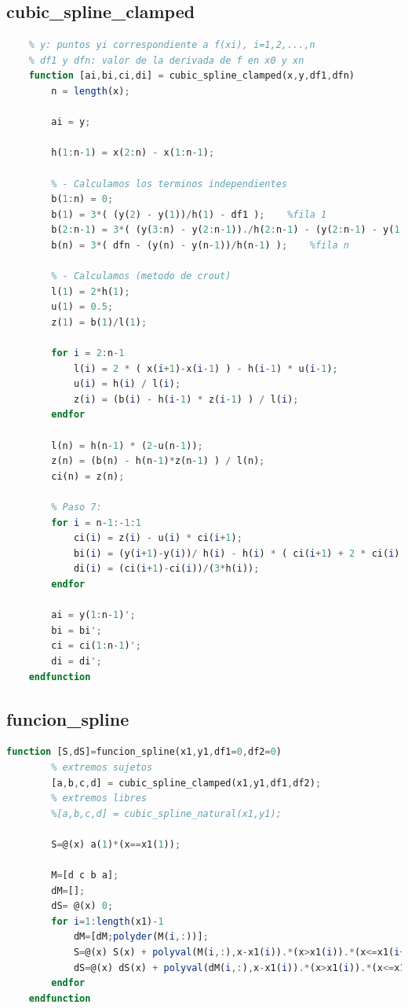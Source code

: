 \documentclass{article}
\begin{document}
    \subsection{cubic\_spline\_clamped}
    \begin{lstlisting}[language=Octave]
    % x: puntos xi, i=1,2,...,n
    % y: puntos yi correspondiente a f(xi), i=1,2,...,n
    % df1 y dfn: valor de la derivada de f en x0 y xn
    function [ai,bi,ci,di] = cubic_spline_clamped(x,y,df1,dfn)
        n = length(x);
    
        ai = y;
    
        h(1:n-1) = x(2:n) - x(1:n-1);
    
        % - Calculamos los terminos independientes
        b(1:n) = 0;
        b(1) = 3*( (y(2) - y(1))/h(1) - df1 );    %fila 1
        b(2:n-1) = 3*( (y(3:n) - y(2:n-1))./h(2:n-1) - (y(2:n-1) - y(1:n-2))./h(1:n-2) );   %filas 2...n-1
        b(n) = 3*( dfn - (y(n) - y(n-1))/h(n-1) );    %fila n
    
        % - Calculamos (metodo de crout)
        l(1) = 2*h(1); 
        u(1) = 0.5;
        z(1) = b(1)/l(1);
    
        for i = 2:n-1
            l(i) = 2 * ( x(i+1)-x(i-1) ) - h(i-1) * u(i-1);
            u(i) = h(i) / l(i);
            z(i) = (b(i) - h(i-1) * z(i-1) ) / l(i);
        endfor
    
        l(n) = h(n-1) * (2-u(n-1));
        z(n) = (b(n) - h(n-1)*z(n-1) ) / l(n);
        ci(n) = z(n);
    
        % Paso 7:
        for i = n-1:-1:1
            ci(i) = z(i) - u(i) * ci(i+1);
            bi(i) = (y(i+1)-y(i))/ h(i) - h(i) * ( ci(i+1) + 2 * ci(i) ) / 3;
            di(i) = (ci(i+1)-ci(i))/(3*h(i));
        endfor
    
        ai = y(1:n-1)';
        bi = bi';
        ci = ci(1:n-1)';
        di = di';
    endfunction
    \end{lstlisting}
    
    \subsection{funcion\_spline}
    \begin{lstlisting}[language=Octave]
    function [S,dS]=funcion_spline(x1,y1,df1=0,df2=0)
        % extremos sujetos
        [a,b,c,d] = cubic_spline_clamped(x1,y1,df1,df2);
        % extremos libres
        %[a,b,c,d] = cubic_spline_natural(x1,y1);
    
        S=@(x) a(1)*(x==x1(1));
    
        M=[d c b a];
        dM=[];
        dS= @(x) 0;
        for i=1:length(x1)-1
            dM=[dM;polyder(M(i,:))];
            S=@(x) S(x) + polyval(M(i,:),x-x1(i)).*(x>x1(i)).*(x<=x1(i+1));
            dS=@(x) dS(x) + polyval(dM(i,:),x-x1(i)).*(x>x1(i)).*(x<=x1(i+1));
        endfor
    endfunction
    \end{lstlisting}
    
\end{document}
